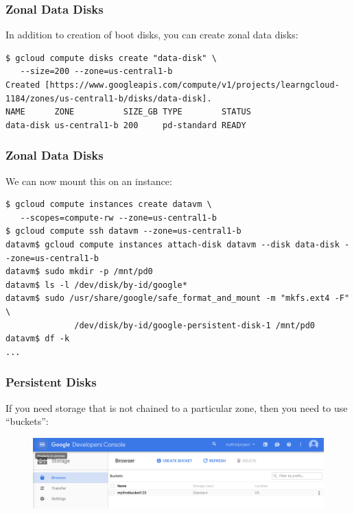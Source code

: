 \documentclass[9pt]{beamer}
\begin{document}
\begin{frame}[fragile]
\frametitle{Zonal Data Disks}
In addition to creation of boot disks, you can create zonal data disks:
\begin{verbatim}
$ gcloud compute disks create "data-disk" \
   --size=200 --zone=us-central1-b
Created [https://www.googleapis.com/compute/v1/projects/learngcloud-1184/zones/us-central1-b/disks/data-disk].
NAME      ZONE          SIZE_GB TYPE        STATUS
data-disk us-central1-b 200     pd-standard READY
\end{verbatim}
\end{frame}

\begin{frame}[fragile]
\frametitle{Zonal Data Disks}
We can now mount this on an instance:
\begin{verbatim}
$ gcloud compute instances create datavm \
   --scopes=compute-rw --zone=us-central1-b
$ gcloud compute ssh datavm --zone=us-central1-b
datavm$ gcloud compute instances attach-disk datavm --disk data-disk --zone=us-central1-b
datavm$ sudo mkdir -p /mnt/pd0
datavm$ ls -l /dev/disk/by-id/google*	
datavm$ sudo /usr/share/google/safe_format_and_mount -m "mkfs.ext4 -F" \
              /dev/disk/by-id/google-persistent-disk-1 /mnt/pd0
datavm$ df -k
...
\end{verbatim}
\end{frame}



\begin{frame}[fragile]
  \frametitle{Persistent Disks}
  If you need storage that is not chained to a particular zone, then you need to use ``buckets'':
  \begin{figure}
    \includegraphics[scale=0.2]{figures/Buckets.png}
  \end{figure}
\end{frame}
\end{document}
